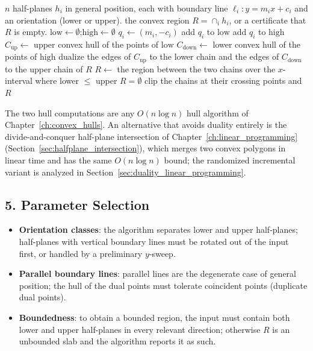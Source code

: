 \begin{algorithm}[htbp]
\caption{Half-Plane Intersection via the Dual Hull}
\label{alg:geo_duality_halfplane_intersection}
\begin{algorithmic}[1]
\Require $n$ half-planes $h_i$ in general position, each with boundary line
       $\ell_i : y = m_i x + c_i$ and an orientation (lower or upper).
\Ensure the convex region $R = \cap_i h_i$, or a certificate that $R$ is empty.
  \State $\text{low} \gets \emptyset$;\quad $\text{high} \gets \emptyset$
    \State $q_i \gets (m_i, -c_i)$ 
      \State add $q_i$ to $\text{low}$
    \Else
      \State add $q_i$ to $\text{high}$
    \EndIf
  \EndFor
  \State $C_{\text{up}} \gets $ upper convex hull of the points of
         $\text{low}$ 
  \State $C_{\text{down}} \gets $ lower convex hull of the points of
         $\text{high}$ 
  \State dualize the edges of $C_{\text{up}}$ to the lower chain and the
         edges of $C_{\text{down}}$ to the upper chain of $R$
  \State $R \gets $ the region between the two chains over the $x$-interval
         where lower $\le$ upper
    \State \Return $R = \emptyset$
  \EndIf
  \State clip the chains at their crossing points and \Return $R$
\EndFunction
\end{algorithmic}
\end{algorithm}

The two hull computations are any $O(n \log n)$ hull algorithm of
Chapter~\ref{ch:convex_hulls}. An alternative that avoids duality entirely
is the divide-and-conquer half-plane intersection of
Chapter~\ref{ch:linear_programming} (Section~\ref{sec:halfplane_intersection}),
which merges two convex polygons in linear time and has the same $O(n \log
n)$ bound; the randomized incremental variant is analyzed in
Section~\ref{sec:duality_linear_programming}.

\subsection{5. Parameter Selection}

\begin{itemize}
\item \textbf{Orientation classes}: the algorithm separates lower and upper
  half-planes; half-planes with vertical boundary lines must be rotated out
  of the input first, or handled by a preliminary $y$-sweep.
\item \textbf{Parallel boundary lines}: parallel lines are the degenerate
  case of general position; the hull of the dual points must tolerate
  coincident points (duplicate dual points).
\item \textbf{Boundedness}: to obtain a bounded region, the input must
  contain both lower and upper half-planes in every relevant direction;
  otherwise $R$ is an unbounded slab and the algorithm reports it as such.
\end{itemize}

